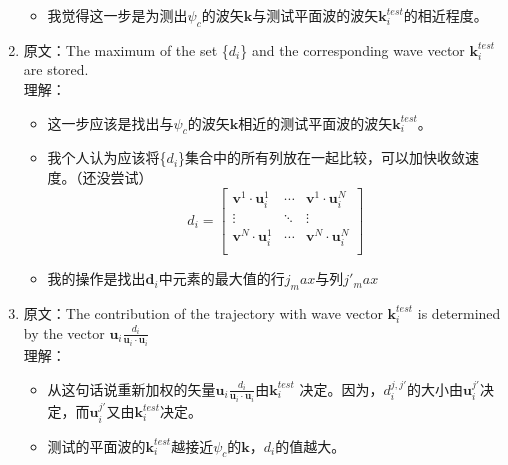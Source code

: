 \documentclass[UTF8]{beamer}
\begin{document}
\begin{frame}[allowframebreaks]
\begin{enumerate}
\begin{itemize}
                \item 我觉得这一步是为测出$\psi_c$的波矢$\mathbf{k}$与测试平面波的波矢$\mathbf{k}_i^{test}$的相近程度。
            \end{itemize}
%
    \item 原文：The maximum of the set \{$d_i$\} and the corresponding wave vector $\mathbf{k}_{i}^{test}$ are stored.\\
          理解：
            \begin{itemize}
                \item 这一步应该是找出与$\psi_c$的波矢$\mathbf{k}$相近的测试平面波的波矢$\mathbf{k}_i^{test}$。
                \item 我个人认为应该将\{$d_i$\}集合中的所有列放在一起比较，可以加快收敛速度。（还没尝试）
                    \begin{equation*}
                        d_i=  
                        \begin{bmatrix}
                            \mathbf{v}^{1}\cdot\mathbf{u}_i^{1}&\cdots&\mathbf{v}^{1}\cdot\mathbf{u}_i^{N}\\
                            \vdots & \ddots &\vdots\\
                            \mathbf{v}^{N}\cdot\mathbf{u}_i^{1}&\cdots&\mathbf{v}^{N}\cdot\mathbf{u}_i^{N}\\
                        \end{bmatrix}
                    \end{equation*}
                \item 我的操作是找出$\mathbf{d}_i$中元素的最大值的行${j_max}$与列${j'_max}$
            \end{itemize}
    \item 原文：The contribution of the trajectory with wave vector $\mathbf{k}_{i}^{test}$ is determined by 
                        the vector $\mathbf{u}_i\frac{d_i}{\mathbf{u}_i\cdot\mathbf{u}_i}$\\
          理解：
            \begin{itemize}
                \item 从这句话说重新加权的矢量$\mathbf{u}_i\frac{d_i}{\mathbf{u}_i\cdot\mathbf{u}_i}$由$\mathbf{k}_{i}^{test}$
                        决定。因为，$d_{i}^{j,j'}$的大小由$\mathbf{u}_{i}^{j'}$决定，而$\mathbf{u}_{i}^{j'}$又由$\mathbf{k}_{i}^{test}$决定。
                \item 测试的平面波的$\mathbf{k}_i^{test}$越接近$\psi_c$的$\mathbf{k}$，$d_i$的值越大。
            \end{itemize}

\end{enumerate}
\end{frame}
\end{document}
